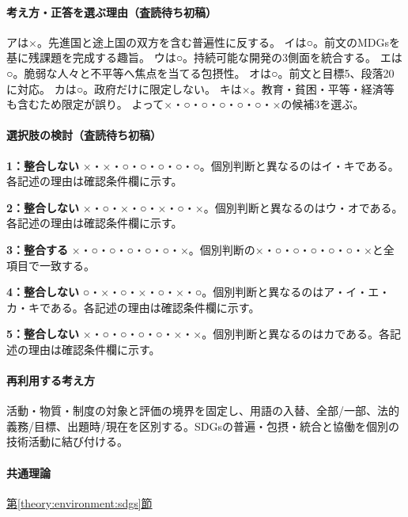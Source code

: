 \paragraph{考え方・正答を選ぶ理由（査読待ち初稿）} アは×。先進国と途上国の双方を含む普遍性に反する。 イは○。前文のMDGsを基に残課題を完成する趣旨。 ウは○。持続可能な開発の3側面を統合する。 エは○。脆弱な人々と不平等へ焦点を当てる包摂性。 オは○。前文と目標5、段落20に対応。 カは○。政府だけに限定しない。 キは×。教育・貧困・平等・経済等も含むため限定が誤り。 よって×・○・○・○・○・○・×の候補3を選ぶ。

\paragraph{選択肢の検討（査読待ち初稿）}\mbox{}\par

\noindent\textbf{1：整合しない} ×・×・○・○・○・○・○。個別判断と異なるのはイ・キである。各記述の理由は確認条件欄に示す。\par

\noindent\textbf{2：整合しない} ×・○・×・○・×・○・×。個別判断と異なるのはウ・オである。各記述の理由は確認条件欄に示す。\par

\noindent\textbf{3：整合する} ×・○・○・○・○・○・×。個別判断の×・○・○・○・○・○・×と全項目で一致する。\par

\noindent\textbf{4：整合しない} ○・×・○・×・○・×・○。個別判断と異なるのはア・イ・エ・カ・キである。各記述の理由は確認条件欄に示す。\par

\noindent\textbf{5：整合しない} ×・○・○・○・○・×・×。個別判断と異なるのはカである。各記述の理由は確認条件欄に示す。\par

\paragraph{再利用する考え方} 活動・物質・制度の対象と評価の境界を固定し、用語の入替、全部/一部、法的義務/目標、出題時/現在を区別する。SDGsの普遍・包摂・統合と協働を個別の技術活動に結び付ける。

\paragraph{共通理論} \hyperref[theory:environment:sdgs]{第\ref*{theory:environment:sdgs}節}

